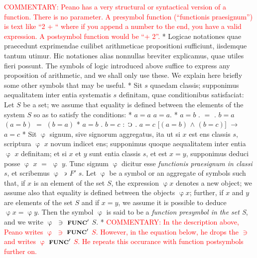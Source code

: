 \documentclass{book}
\newcommand{\C}{\mathop{\sbox0{$\displaystyle$$\reflectbox{C}$} %
\raisebox{-\height+\ht0-0.05cm}[\ht0][\dp0]{\scalebox{0.8}[0.8]{\copy0}}}\displaylimits} %
\newcommand{\such}{\thinspace \rotatebox[origin=c]{180}{$\epsilon$}}
\newcommand{\func}{\mathord{\text{{\footnotesize \textbf{FUNC}}}}}
\newcommand\commentary[1]{\textcolor{red}{COMMENTARY: #1}}
\newenvironment{translateTwoCol}
               { %
                 \columnratio{0.5, 0.5}
                 \begin{paracol}{2}
                 \newcommand{\LAT}{\switchcolumn[0]*}
                 \newcommand{\ENG}{\switchcolumn[1]}
               }
               { %
                 \let\ENG\undefined
                 \let\LAT\undefined
                 \end{paracol}
               }
\begin{document}
\begin{translateTwoCol}
\ENG
\commentary{Peano has a very structural or syntactical version of a function.  There is no parameter.  A presymbol function (``functionis praesignum'') is text like ``2 + `` where if you append a number to the end, you have a valid expression.   A postsymbol function would be ``+ 2''.} 
\LAT  
Logicae notationes quae praecedunt exprimendae cuilibet arithmeticae propositioni sufficiunt, iisdemque tantum utimur. Hic notationes alias nonnullas breviter explicamus, quae utiles fieri possunt.
\ENG
The symbols of logic introduced above suffice to express any proposition of arithmetic, and we shall only use these.  We explain here briefly some other symbols that may be useful. %
\LAT
Sit $s$ quaedam classis; supponimus aequalitatem inter entia systematis $s$ definitam, quae conditionibus satisfaciat:
\ENG
Let $S$ be a set; we assume that equality is defined between the elements of the system $S$ so as to satisfy the conditions:
\LAT
\hspace{1.06cm} $a=a$
\ENG
\hspace{1.06cm} $a=a$.
\LAT
\hspace{1.06cm} $a=b$ $.$ $=$ $.$ $b=a$
\ENG
\hspace{1.06cm} $(a=b)$ $=$ $(b=a)$
\LAT
\hspace{1.06cm} $a=b$ . $b=c$ $:$ $\C$ $.$ $a=c$
\ENG
\hspace{1.06cm} $[(a=b)$ $\wedge$ $(b=c)]$ $\rightarrow$ $a=c$
\LAT
Sit $\upvarphi$ signum, sive signorum aggregatus, ita ut si $x$ est ens classis $s$, scriptura $\upvarphi$ $x$ novum indicet ens; supponimus quoque aequalitatem inter entia $\upvarphi$ $x$ definitam; et si $x$ et $y$ sunt entia classis $s$, et est $x=y$, supponimus deduci posse $\upvarphi$ $x$ $=$ $\upvarphi$ $y$. Tunc signum $\upvarphi$ dicitur esse \emph{functionis praesignum in classi} $s$, et scribemus $\upvarphi$ $\such$ $F'$ $s$.
\ENG
Let $\upvarphi$ be a symbol or an aggregate of symbols such that, if $x$ is an element of the set $S$, the expression $\upvarphi x$ denotes a new object; we assume also that equality is defined between the objects $\upvarphi x$; further, if $x$ and $y$ are elements of the set $S$ and if $x = y$, we assume it is possible to deduce $\upvarphi x = \upvarphi y$. Then the symbol $\upvarphi$ is said to be a \emph{function presymbol in the set S}, and we write $\upvarphi$ $\ni$ $\func'$ $S$.
\LAT
\ENG
\commentary{In the description above, Peano writes $\upvarphi$ $\ni$ $\func'$ $S$.  However, in the equation below, he drops the $\ni$ and writes $\upvarphi$ $\func'$ $S$.  He repeats this occurance with function postsymbols further on.}

\end{translateTwoCol}
\end{document}
